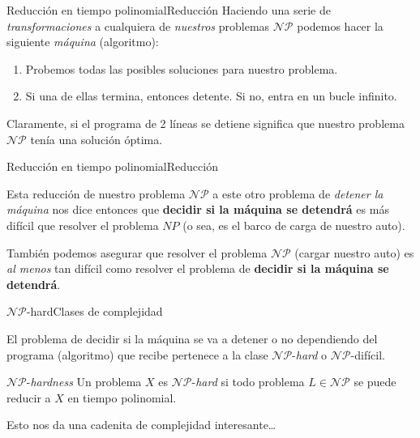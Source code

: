 \documentclass[spanish, c]{beamer}
\begin{document}
\begin{frame}{Reducción en tiempo polinomial}{Reducción}
    Haciendo una serie de \textit{transformaciones} a cualquiera de \textit{nuestros} problemas $\mathcal{NP}$ podemos hacer la siguiente \textit{máquina} (algoritmo): \pause

    \bigskip

    \begin{enumerate}[1.]
        \item Probemos todas las posibles soluciones para nuestro problema. \pause
        \item Si una de ellas termina, entonces detente. Si no, entra en un bucle infinito.
    \end{enumerate} \pause

    \bigskip

    Claramente, si el programa de 2 líneas se detiene significa que nuestro problema $\mathcal{NP}$ tenía una solución óptima.
\end{frame}

\begin{frame}{Reducción en tiempo polinomial}{Reducción}

    Esta reducción de nuestro problema $\mathcal{NP}$ a este otro problema de \textit{detener la máquina} nos dice entonces que \textbf{decidir si la máquina se detendrá} es \alert{más difícil} que resolver el problema $NP$ (o sea, es el barco de carga de nuestro auto). \pause

    \bigskip
    
    También podemos asegurar que resolver el problema $\mathcal{NP}$ (cargar nuestro auto) es \textit{al menos} \alert{tan difícil} como resolver el problema de \textbf{decidir si la máquina se detendrá}.
\end{frame}

\begin{frame}{\texorpdfstring{$\mathcal{NP}$}{NP}-hard}{Clases de complejidad}
    
    El problema de decidir si la máquina se va a detener o no dependiendo del programa (algoritmo) que recibe pertenece a la clase $\mathcal{NP}$-\textit{hard} o $\mathcal{NP}$-difícil. \pause

    \bigskip

    \begin{block}{$\mathcal{NP}$-\textit{hardness}}
        Un problema $X$ es $\mathcal{NP}$-\textit{hard} si todo problema $L \in \mathcal{NP}$ se puede reducir a $X$ en tiempo polinomial.
    \end{block}

    \bigskip
    
    Esto nos da una cadenita de complejidad interesante\dots
\end{frame}
\end{document}
